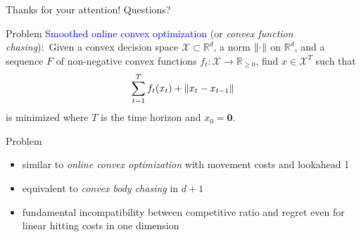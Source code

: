 \documentclass{beamer}
\def\b{\textcolor{blue}}
\DeclarePairedDelimiter{\norm}{\lVert}{\rVert}
\begin{document}
\begin{frame}
\centering \large
Thanks for your attention!
Questions?
\end{frame}


\begin{frame}{Problem}
\b{Smoothed online convex optimization} (or \emph{convex function chasing}):\pause\ Given a convex decision space $\mathcal{X} \subset \mathbb{R}^d$, a norm $\norm{\cdot}$ on $\mathbb{R}^d$, and a sequence $F$ of non-negative convex functions $f_t : \mathcal{X} \to \mathbb{R}_{\geq 0}$\pause, find $x \in \mathcal{X}^T$ such that \begin{align*}
    \sum_{t=1}^T f_t(x_t) + \norm{x_t - x_{t-1}}
\end{align*} is minimized where $T$ is the time horizon and $x_0 = \mathbf{0}$.
\end{frame}
\begin{frame}{Problem}
\begin{itemize}
    \item similar to \emph{online convex optimization} with movement costs and lookahead 1\pause
    \item equivalent to \emph{convex body chasing} in $d + 1$\pause
    \item fundamental incompatibility between competitive ratio and regret even for linear hitting costs in one dimension
\end{itemize}
\end{frame}
\end{document}
